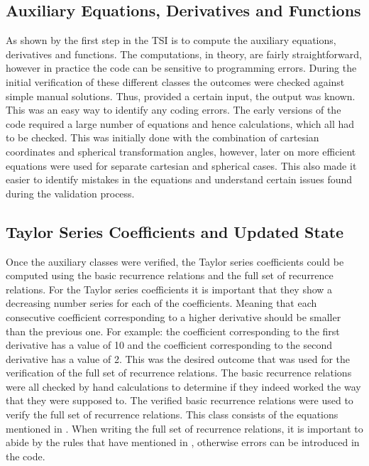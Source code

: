 \subsection{Auxiliary Equations, Derivatives and Functions}
\label{subsec:auxEqDerFunverval}
As shown by  the first step in the \ac{TSI} is to compute the auxiliary equations, derivatives and functions. The computations, in theory, are fairly straightforward, however in practice the code can be sensitive to programming errors. During the initial verification of these different classes the outcomes were checked against simple manual solutions. Thus, provided a certain input, the output was known. This was an easy way to identify any coding errors. The early versions of the code required a large number of equations and hence calculations, which all had to be checked. This was initially done with the combination of cartesian coordinates and spherical transformation angles, however, later on more efficient equations were used for separate cartesian and spherical cases. This also made it easier to identify mistakes in the equations and understand certain issues found during the validation process. 

\subsection{Taylor Series Coefficients and Updated State}
\label{subsec:TaySerCoefverval}
Once the auxiliary classes were verified, the Taylor series coefficients could be computed using the basic recurrence relations and the full set of recurrence relations. For the Taylor series coefficients it is important that they show a decreasing number series for each of the coefficients. Meaning that each consecutive coefficient corresponding to a higher derivative should be smaller than the previous one. For example: the coefficient corresponding to the first derivative has a value of 10 and the coefficient corresponding to the second derivative has a value of 2. This was the desired outcome that was used for the verification of the full set of recurrence relations. The basic recurrence relations were all checked by hand calculations to determine if they indeed worked the way that they were supposed to. The verified basic recurrence relations were used to verify the full set of recurrence relations. This class consists of the equations mentioned in . When writing the full set of recurrence relations, it is important to abide by the rules that have mentioned in , otherwise errors can be introduced in the code. 

